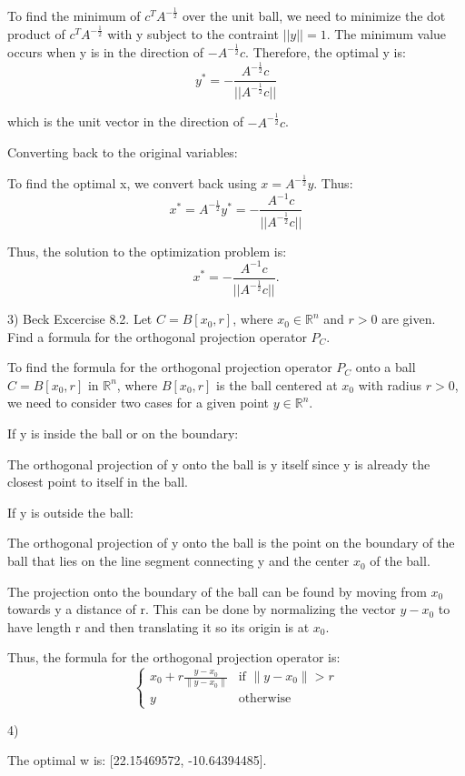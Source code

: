 \documentclass{article}
\newcommand{\RR}{\mathbb{R}}
\begin{document}
To find the minimum of $c^T A^{-\frac{1}{2}}$ over the unit ball, we need
to minimize the dot product of $c^T A^{-\frac{1}{2}}$ with y
subject to the contraint $||y|| = 1$. The minimum value occurs when y
is in the direction of $-A^{-\frac{1}{2}} c$. Therefore, the optimal
y is:
\[y^{*} = -\frac{A^{-\frac{1}{2}} c}{||A^{-\frac{1}{2}} c||}\]

which is the unit vector in the direction of $-A^{-\frac{1}{2}} c$.

Converting back to the original variables:

To find the optimal x, we convert back using $x = A^{-\frac{1}{2}} y$. Thus:
\[x^{*} = A^{-\frac{1}{2}} y^{*} = -\frac{A^{-1} c}{||A^{-\frac{1}{2}} c||}\]

Thus, the solution to the optimization problem is:
\[x^{*} = -\frac{A^{-1} c}{||A^{-\frac{1}{2}} c||}.\]


3) Beck Excercise 8.2. Let $C = B[x_0, r]$, where
$x_0 \in \RR^n$ and $r > 0$ are given. Find a formula
for the orthogonal projection operator $P_C$.

To find the formula for the orthogonal projection operator $P_C$ onto a ball
$C = B[x_0, r]$ in $\RR^n$, where $B[x_0, r]$ is the ball centered at $x_0$
with radius $r > 0$, we need to consider two cases for a given point $y \in \RR^n$.

If y is inside the ball or on the boundary:

The orthogonal projection of y onto the ball is y itself since y
is already the closest point to itself in the ball.


If y is outside the ball:

The orthogonal projection of y onto the ball is the point
on the boundary of the ball that lies on the line segment connecting y
and the center $x_0$ of the ball. 

The projection onto the boundary of the ball can be found by moving from $x_0$
towards y a distance of r. This can be done by normalizing the vector $y-x_0$
to have length r and then translating it so its origin is at $x_0$.

Thus, the formula for the orthogonal projection operator is:
\[\begin{cases}
    x_0 + r \frac{y - x_0}{\|y - x_0\|} & \text{if } \|y - x_0\| > r \\
    y & \text{otherwise}
\end{cases} \]


4)

The optimal w is: [22.15469572, -10.64394485].
\end{document}
